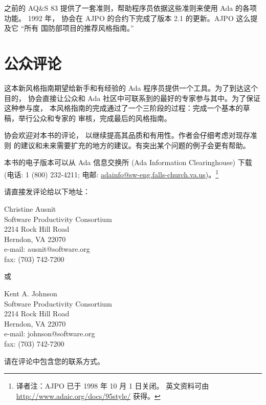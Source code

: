 之前的 AQ\&S 83 提供了一套准则，帮助程序员依据这些准则来使用 Ada 的各项功能。
1992 年， 协会在 AJPO 的合约下完成了版本 2.1 的更新。AJPO 这么提及它 ``所有
国防部项目的推荐风格指南。''

\section{公众评论}
这本新风格指南期望给新手和有经验的 Ada 程序员提供一个工具。为了到达这个目的，
协会直接让公众和 Ada 社区中可联系到的最好的专家参与其中。为了保证这种参与度，
本风格指南的完成通过了一个三阶段的过程：完成一个基本的草稿，举行公众和专家的
审核，完成最后的风格指南。

协会欢迎对本书的评论， 以继续提高其品质和有用性。作者会仔细考虑对现存准则
的建议和未来需要扩充的地方的建议。有突出某个问题的例子会更有帮助。

本书的电子版本可以从 Ada 信息交换所 (Ada Information Clearinghouse)
下载 (电话: 1 (800) 232-4211; 电邮:
\url{adainfo@sw-eng.falls-church.va.us})。\footnote{
译者注：AJPO 已于 1998 年 10 月 1 日关闭。
英文资料可由 \url{http://www.adaic.org/docs/95style/} 获得。}

请直接发评论给以下地址：

\noindent
Christine Ausnit\\
Software Productivity Consortium\\
2214 Rock Hill Road\\
Herndon, VA 22070\\
e-mail: ausnit@software.org\\
fax: (703) 742-7200

或

\noindent
Kent A. Johnson\\
Software Productivity Consortium\\
2214 Rock Hill Road\\
Herndon, VA 22070\\
e-mail: johnson@software.org\\
fax: (703) 742-7200

请在评论中包含您的联系方式。
